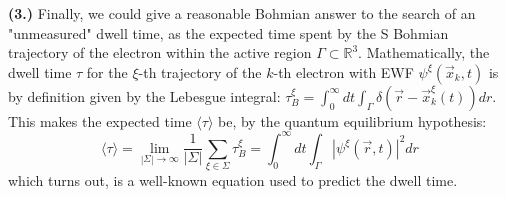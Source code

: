 \documentclass[11pt, a4paper]{article} %
\newcommand{\R}{\mathbb{R}} %
\begin{document}
{\bf (3.) }Finally, we could give a reasonable Bohmian answer to the search of an "unmeasured" dwell time, as the expected time spent by the S Bohmian trajectory of the electron within the active region $\Gamma\subset \R^3$. Mathematically, the dwell time $\tau$ for the $\xi$-th trajectory of the $k$-th electron with EWF $\psi^\xi(\vec{x}_k,t)$ is by definition given by the Lebesgue integral: $\tau^\xi_B= \int_{0}^\infty  dt \int_\Gamma \delta(\vec{r}-\vec{x}_k^\xi(t)) dr$. This makes the expected time $\langle \tau\rangle$ be, by the quantum equilibrium hypothesis:
\begin{equation}
\langle \tau \rangle = \lim_{|\Sigma|\rightarrow \infty}\frac{1}{|\Sigma|} \sum_{\xi\in\Sigma} \tau_B^\xi = \int_{0}^\infty dt \int_\Gamma |\psi^\xi(\vec{r},t)|^2dr
\end{equation}
which turns out, is a well-known equation used to predict the dwell time.

\end{document}
